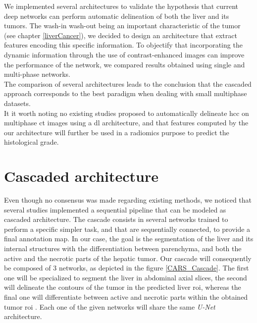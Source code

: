 We implemented several architectures to validate the hypothesis that
current deep networks can perform automatic delineation of both the
liver and its tumors. The wash-in wash-out being an important characteristic of the tumor (see chapter \ref{liverCancer}), we decided to design an architecture that extract features encoding this specific information. To objectify that incorporating the dynamic information through the use of contrast-enhanced images can improve the performance of the network, we compared results obtained using single and multi-phase networks. \\
The comparison of several architectures leads to the conclusion that the cascaded approach corresponds to the best paradigm when dealing with small multiphase datasets.\\
It it worth noting no existing studies proposed to automatically 
delineate \ac{hcc} on multiphase \ac{ct} images using a \ac{dl} architecture, and that features computed by the our architecture will further be used in a radiomics purpose to predict the histological grade.



\section{Cascaded architecture}

Even though no consensus was made regarding existing methods, we noticed that
several studies implemented a sequential pipeline that can be modeled as
cascaded architecture. The cascade consists in several networks trained
to perform a specific simpler task, and that are sequentially connected, to
provide a final annotation map. In our case, the goal is the
segmentation of the liver and its internal structures with the
differentiation between parenchyma, and both the active and the necrotic
parts of the hepatic tumor.
Our cascade will consequently be composed of 3 networks, as depicted
in the figure \ref{CARS_Cascade}. The first one will be specialized to segment the liver in
abdominal axial slices, the second will delineate the contours of the
tumor in the predicted liver \ac{roi}, whereas the final one will
differentiate between active and necrotic parts within the obtained
tumor \ac{roi} \cite{Ouhmich2019}.
Each one of the given networks will share the same \emph{U-Net}
architecture.

